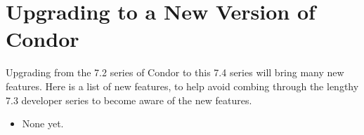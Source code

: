 \section{\label{sec:gotchas}Upgrading to a New Version of Condor}

Upgrading from the 7.2 series of Condor to this 7.4 series will
bring many new features.
Here is a list of new features,
to help avoid combing through the lengthy 7.3 developer
series to become aware of the new features.


\begin{itemize}

\item  None yet. 

\end{itemize}

